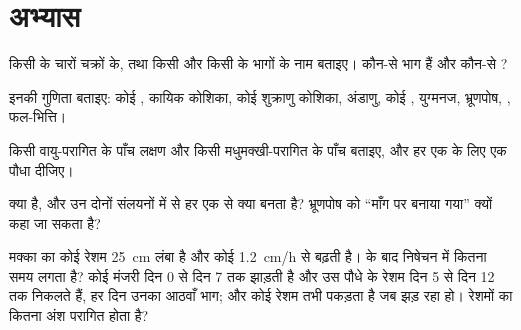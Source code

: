 \section{अभ्यास}

\begin{exercise}[$\star$]\label{exo:b2:angiosperm-reproduction:1}
किसी  के चारों चक्रों के, तथा किसी  और किसी
 के भागों के नाम बताइए। कौन-से भाग   हैं और
कौन-से  ?
\end{exercise}

\begin{exercise}[$\star$]\label{exo:b2:angiosperm-reproduction:2}
इनकी गुणिता बताइए: कोई , कायिक कोशिका, कोई शुक्राणु कोशिका,
अंडाणु, कोई , युग्मनज, भ्रूणपोष, ,
फल-भित्ति।
\end{exercise}

\begin{exercise}[$\star$]\label{exo:b2:angiosperm-reproduction:3}
किसी वायु-परागित  के पाँच लक्षण और किसी
मधुमक्खी-परागित के पाँच बताइए, और हर एक के लिए एक पौधा दीजिए।
\end{exercise}

\begin{exercise}[$\star$]\label{exo:b2:angiosperm-reproduction:4}
 क्या है, और उन दोनों संलयनों में से हर एक से क्या
बनता है? भ्रूणपोष को ``माँग पर बनाया गया'' क्यों कहा जा सकता है?
\end{exercise}

\begin{exercise}[$\star\star$]\label{exo:b2:angiosperm-reproduction:5}
मक्का का कोई रेशम \qty{25}{cm} लंबा है और कोई 
\qty{1.2}{cm/h} से बढ़ती है।  के बाद निषेचन में कितना समय लगता है?
कोई मंजरी दिन 0 से दिन 7 तक  झाड़ती है और उस पौधे के रेशम
दिन 5 से दिन 12 तक निकलते हैं, हर दिन उनका आठवाँ भाग; और कोई रेशम
 तभी पकड़ता है जब  झड़ रहा हो। रेशमों का कितना अंश
परागित होता है?
\end{exercise}

